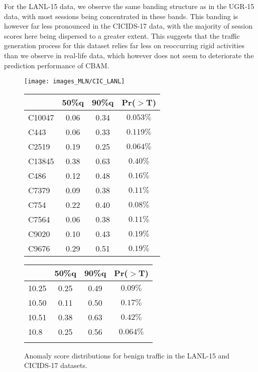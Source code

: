 For the LANL-15 data, we observe the same banding structure as in the UGR-15 data, with most sessions being concentrated in these bands. This banding is however far less pronounced in the CICIDS-17 data, with the majority of session scores here being dispersed to a greater extent. This suggests that the traffic generation process for this dataset relies far less on reoccurring rigid activities than we observe in real-life data, which however does not seem to deteriorate the prediction performance of CBAM. 


\begin{figure}%
    \begin{center}
\texttt{[image: images\_MLN/CIC\_LANL]} 
\begin{tabular}{l|ccc}
  \hline &  50\%q  &  90\%q  & Pr($>$T) \\ 
  \hline
C10047 & 0.06 & 0.34 & $0.053\%$ \\ 
  C443 & 0.06 & 0.33 &  $0.119\%$ \\ 
  C2519 & 0.19 & 0.25 & $0.064\%$ \\ 
  C13845 & 0.38 & 0.63 & $0.40\%$ \\ 
  C486 & 0.12 & 0.48 & $0.16\%$ \\ 
  C7379 & 0.09 & 0.38 & $0.11\%$ \\ 
  C754 & 0.22 & 0.40 &  $0.08\%$ \\ 
  C7564 & 0.06 & 0.38 & $0.11\%$ \\ 
  C9020 & 0.10 & 0.43 & $0.19\%$ \\ 
  C9676 & 0.29 & 0.51 & $0.19\%$ \\ 
   \hline
\end{tabular}
\quad
\begin{tabular}{l|ccc}
  \hline
 &  50\%q  &  90\%q  &  Pr($>$T) \\ 
  \hline
10.25 & 0.25 & 0.49 &  $0.09\%$ \\ 
10.50 & 0.11 & 0.50  & $0.17\%$ \\ 
10.51 & 0.38 & 0.63  & $0.42\%$ \\ 
10.8 & 0.25 & 0.56 & $0.064\%$ \\ 
   \hline
\multicolumn{2}{c}{}
\vspace{2.1cm}
\end{tabular}
\end{center}
\caption{Anomaly score distributions for benign traffic in the LANL-15 and CICIDS-17 datasets.%
}\label{figF:CICrealresults}
\end{figure}


